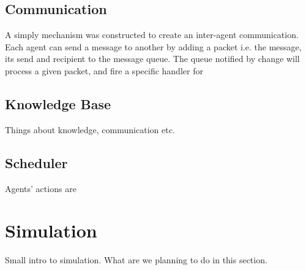 \documentclass[conference]{IEEEtran}
\begin{document}
\subsection{Communication}
A simply mechanism was constructed to create an inter-agent communication.
Each agent can send a message to another by adding a packet i.e. the message, its send and 
recipient to the message queue.
The queue notified by change will process a given packet, and fire a specific handler for









\subsection{Knowledge Base}
Things about knowledge, communication etc.








\subsection{Scheduler}
Agents' actions are 







\section{Simulation}
Small intro to simulation. What are we planning to do in this section.
\end{document}
